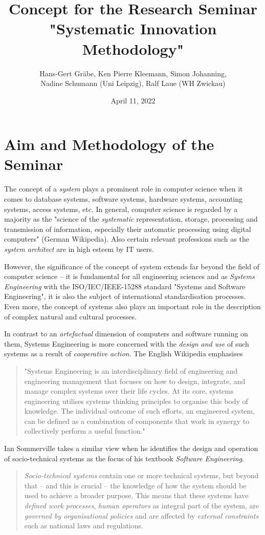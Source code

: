\documentclass[11pt,a4paper]{article}
\title{Concept for the Research Seminar\\ "Systematic Innovation Methodology"}
\author{Hans-Gert Gr\"abe, Ken Pierre Kleemann, Simon Johanning,\\ Nadine
  Schumann (Uni Leipzig), Ralf Laue (WH Zwickau) }
\date{April 11, 2022}
\begin{document}
\maketitle

\section{Aim and Methodology of the Seminar}

The concept of a \emph{system} plays a prominent role in computer science when
it comes to database systems, software systems, hardware systems, accounting
systems, access systems, etc.  In general, computer science is regarded by a
majority as the "science of the \emph{systematic} representation, storage,
processing and transmission of information, especially their automatic
processing using digital computers" (German Wikipedia).  Also certain relevant
professions such as the \emph{system architect} are in high esteem by IT
users.

However, the significance of the concept of system extends far beyond the
field of computer science -- it is fundamental for all engineering sciences
and as \emph{Systems Engineering} with the ISO/IEC/IEEE-15288 standard
"Systems and Software Engineering", it is also the subject of international
standardisation processes.  Even more, the concept of systems also plays an
important role in the description of complex natural and cultural processes.

In contrast to an \emph{artefactual} dimension of computers and software
running on them, Systems Engineering is more concerned with the \emph{design
  and use} of such systems as a result of \emph{cooperative action}.  The
English Wikipedia emphasises 
\begin{quote}
  "Systems Engineering is an interdisciplinary field of engineering and
  engineering management that focuses on how to design, integrate, and manage
  complex systems over their life cycles. At its core, systems engineering
  utilises systems thinking principles to organise this body of knowledge. The
  individual outcome of such efforts, an engineered system, can be defined as
  a combination of components that work in synergy to collectively perform a
  useful function."
\end{quote}

Ian Sommerville takes a similar view when he identifies the design and
operation of socio-technical systems as the focus of his textbook
\emph{Software Engineering}.
\begin{quote}  
  \emph{Socio-technical systems} contain one or more technical systems, but
  beyond that – and this is crucial – the knowledge of how the system should
  be used to achieve a broader purpose. This means that these systems have
  \emph{defined work processes}, \emph{human operators} as integral part of
  the system, are \emph{governed by organisational policies} and are affected
  by \emph{external constraints} such as national laws and regulations.
  \cite[p. 48]{Sommerville}
\end{quote}
\end{document}
